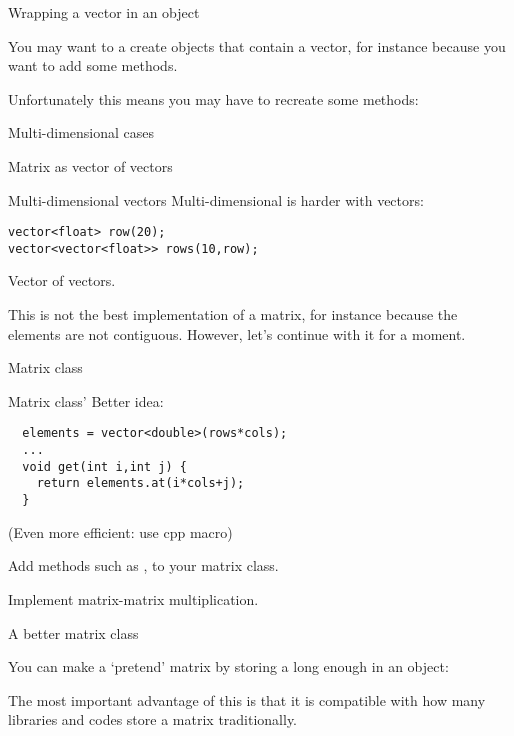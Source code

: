  {Wrapping a vector in an object}

You may want to a create objects that contain a vector, for instance
because you want to add some methods.
%

Unfortunately this means you may have to recreate some methods:
%

 {Multi-dimensional cases}

 {Matrix as vector of vectors}

\begin{block}{Multi-dimensional vectors}
  \label{sl:multi-vector}
  Multi-dimensional is harder with vectors:
\begin{verbatim}
vector<float> row(20);
vector<vector<float>> rows(10,row);
\end{verbatim}
Vector of vectors.
\end{block}

This is not the best implementation of a matrix, for instance because
the elements are not contiguous. However, let's continue with it for a moment.

\begin{block}{Matrix class}
  \label{sl:matrix-class}
\end{block}

\begin{block}{Matrix class'}
  \label{sl:matrix-class-cont}
  Better idea:
\begin{verbatim}
  elements = vector<double>(rows*cols);
  ...
  void get(int i,int j) {
    return elements.at(i*cols+j);
  }
\end{verbatim}
(Even more efficient: use cpp macro)
\end{block}

\begin{exercise}
  \label{ex:matrix-methods}
  Add methods such as ,  to your matrix class.

  Implement matrix-matrix multiplication.
\end{exercise}

 {A better matrix class}

You can make a `pretend' matrix by storing a long enough  in
an object:
%

The most important advantage of this is that it is compatible with how
many libraries and codes store a matrix traditionally.

